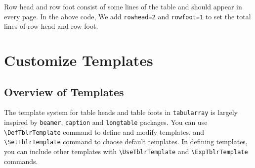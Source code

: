 \documentclass[oneside]{book}
\begin{document}
Row head and row foot consist of some lines of the table and should appear in every page.
In the above code, We add \verb!rowhead=2! and \verb!rowfoot=1! to set the total lines of row head and row foot.

\section{Customize Templates}

\subsection{Overview of Templates}

The template system for table heads and table foots in \verb!tabularray! is largely inspired by \verb!beamer!,
\verb!caption! and \verb!longtable! packages. You can use \verb!\DefTblrTemplate! command to define and
modify templates, and \verb!\SetTblrTemplate! command to choose default templates. In defining templates,
you can include other templates with \verb!\UseTblrTemplate! and \verb!\ExpTblrTemplate! commands.
\end{document}

